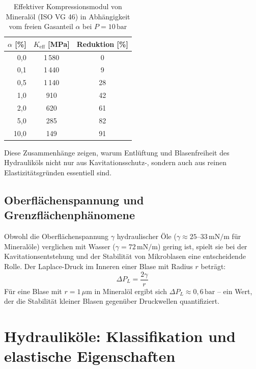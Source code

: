 ﻿\documentclass[a4paper,12pt]{scrreprt}
\theoremstyle{definition}
\begin{document}
\begin{table}[H]
  \centering
  \caption{Effektiver Kompressionsmodul von Mineralöl (ISO VG 46) in
    Abhängigkeit vom freien Gasanteil $\alpha$ bei $P = 10\,\mathrm{bar}$}
  \label{tab:k_eff_gas}
  \begin{tabular}{rcc}
    \toprule
    $\alpha$ [\%] & $K_{\mathrm{eff}}$ [MPa] & Reduktion [\%] \\
    \midrule
    0{,}0    & 1\,580 &   0 \\
    0{,}1    & 1\,440 &   9 \\
    0{,}5    & 1\,140 &  28 \\
    1{,}0    &   910  &  42 \\
    2{,}0    &   620  &  61 \\
    5{,}0    &   285  &  82 \\
    10{,}0   &   149  &  91 \\
    \bottomrule
  \end{tabular}
\end{table}

Diese Zusammenhänge zeigen, warum Entlüftung und Blasenfreiheit des
Hydrauliköls nicht nur aus Kavitationsschutz-, sondern auch aus reinen
Elastizitätsgründen essentiell sind.

\subsection{Oberflächenspannung und Grenzflächenphänomene}

Obwohl die Oberflächenspannung $\gamma$ hydraulischer Öle
($\gamma \approx 25$--$33\,\mathrm{mN/m}$ für Mineralöle) verglichen mit
Wasser ($\gamma = 72\,\mathrm{mN/m}$) gering ist, spielt sie bei der
Kavitationsentstehung und der Stabilität von Mikroblasen eine entscheidende
Rolle. Der Laplace-Druck im Inneren einer Blase mit Radius $r$ beträgt:
\begin{equation}
  \Delta P_L = \frac{2\gamma}{r}
  \label{eq:laplace}
\end{equation}
Für eine Blase mit $r = 1\,\mu\mathrm{m}$ in Mineralöl ergibt sich
$\Delta P_L \approx 0{,}6\,\mathrm{bar}$ -- ein Wert, der die Stabilität
kleiner Blasen gegenüber Druckwellen quantifiziert.

\section{Hydrauliköle: Klassifikation und elastische Eigenschaften}
\end{document}
